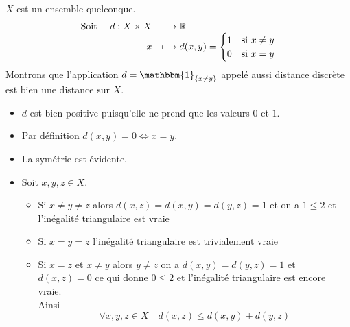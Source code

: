 \documentclass[12pt,a4paper]{article}
\begin{document}
	 \begin{exo}
	 $X$ est un ensemble quelconque.
	\begin{equation*}
		\begin{array}[]{rll}
			\text{Soit }\quad d: X\times X &\longrightarrow \ens{R}\\
			x &\longmapsto d(x,y)=\begin{cases}
				1 & \text{si } x\neq y\\
				0 & \text{si } x=y
			\end{cases}
		\end{array}
	\end{equation*}
	Montrons que l'application $\grandm d=\mathbbm{1}_{\lbrace x\neq y\rbrace} $ appelé aussi distance discrète est bien une distance sur $X$.
	\begin{itemize}[label=$\bullet$]
		\item $d$ est bien positive puisqu'elle ne prend que les valeurs $0$ et $1$.
		\item Par définition $d(x,y)=0\Longleftrightarrow x=y$.
		\item La symétrie est évidente.
		\item Soit $x,y,z\in X$.
		\begin{itemize}
			\item Si $x\neq y\neq z$ alors $d(x,z)=d(x,y)=d(y,z)=1$ et on a $1\leq 2$ et l'inégalité triangulaire est vraie
			\item Si $x= y= z$ l'inégalité triangulaire est trivialement vraie
			\item Si $x=z$ et $x\neq y$ alors $y \neq z$ on a $d(x,y)=d(y,z)=1$ et $d(x,z)=0$ ce qui donne $0\leq 2$ et l'inégalité triangulaire est encore vraie.\\
			Ainsi \[\forall x,y,z \in X \quad d(x,z)\leq d(x,y)+d(y,z) \]
		\end{itemize}
	\end{itemize}
	\end{exo}
\end{document}

